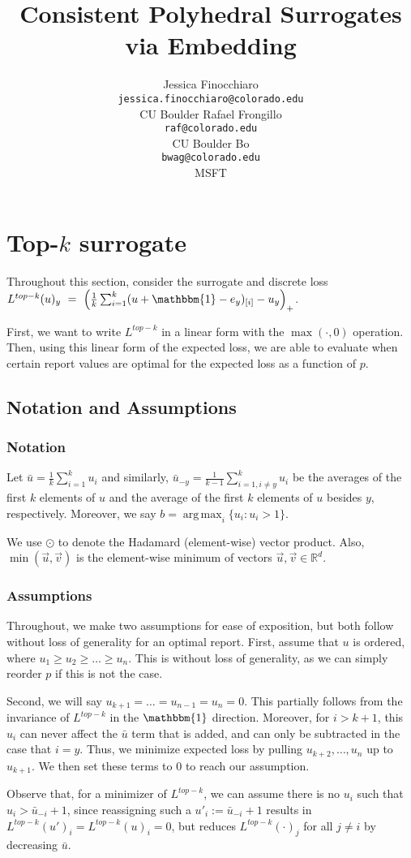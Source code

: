 \documentclass[12pt]{article}
\title{Consistent Polyhedral Surrogates via Embedding}
\author{%
 Jessica Finocchiaro\raf{Jessie?} \\
 \texttt{jessica.finocchiaro@colorado.edu}\\
 CU Boulder
 \And
 Rafael Frongillo\\
 \texttt{raf@colorado.edu}\\
 CU Boulder
 \And
 Bo\\
 \texttt{bwag@colorado.edu}\\
 MSFT
}
\newcommand{\reals}{\mathbb{R}}
\newcommand{\ubar}{\bar{u}}
\newcommand{\ones}{\mathbbm{1}}
\DeclareMathOperator*{\argmax}{arg\,max}
\begin{document}
\section{Top-$k$ surrogate}
Throughout this section, consider the surrogate and discrete loss $L^{top-k}(u)_y~=~\left(\frac{1}{k} \sum_{i=1}^k (u + \ones - e_y)_{[i]} - u_y \right)_+$.

First, we want to write $L^{top-k}$ in a linear form with the $\max(\cdot, 0)$ operation.
Then, using this linear form of the expected loss, we are able to evaluate when certain report values are optimal for the expected loss as a function of $p$.

\subsection{Notation and Assumptions}
\subsubsection{Notation}
Let $\bar{u} = \frac 1 k \sum_{i = 1}^k u_i$ and similarly, $\bar{u}_{-y} = \frac{1}{k-1} \sum_{i=1, i \neq y}^k u_i$ be the averages of the first $k$ elements of $u$ and the average of the first $k$ elements of $u$ besides $y$, respectively.
Moreover, we say $b = \argmax_i \{u_i : u_i > 1\}$.

We use $\odot$ to denote the Hadamard (element-wise) vector product.
Also, $\min(\vec u, \vec v)$ is the element-wise minimum of vectors $\vec u, \vec v \in \reals^d$.

\subsubsection{Assumptions}
Throughout, we make two assumptions for ease of exposition, but both follow without loss of generality for an optimal report.
First, assume that $u$ is ordered, where $u_1 \geq u_2 \geq \ldots \geq u_n$.
This is without loss of generality, as we can simply reorder $p$ if this is not the case.

Second, we will say $u_{k+1} = \ldots = u_{n-1} = u_n = 0$.
This partially follows from the invariance of $L^{top-k}$ in the $\ones$ direction.
Moreover, for $i > k+1$, this $u_i$ can never affect the $\bar{u}$ term that is added, and can only be subtracted in the case that $i = y$.
Thus, we minimize expected loss by pulling $u_{k+2},\ldots, u_n$ up to $u_{k+1}$.
We then set these terms to $0$ to reach our assumption.

Observe that, for a minimizer of $L^{top-k}$, we can assume there is no $u_i$ such that $u_i > \bar u_{-i} +1$, since reassigning such a $u'_i := \bar u_{-i} +1$ results in $L^{top-k}(u')_i = L^{top-k}(u)_i = 0$, but reduces $L^{top-k}(\cdot)_j$ for all $j \neq i$ by decreasing $\ubar$.
\end{document}
